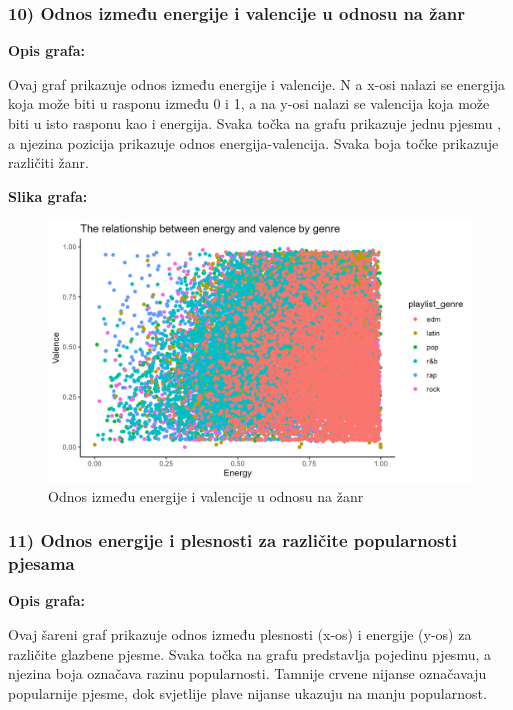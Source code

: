		\subsubsection{10) Odnos između energije i valencije u odnosu na žanr}
    
    \textbf{Opis grafa:}
    
    	Ovaj graf prikazuje odnos između energije i valencije. N a x-osi nalazi se energija koja može biti u rasponu između 0 i 1, a na y-osi nalazi se valencija koja može biti u isto rasponu kao i energija. Svaka točka na grafu prikazuje jednu pjesmu , a njezina pozicija prikazuje odnos energija-valencija. Svaka boja točke prikazuje različiti žanr. 
    
    \textbf{Slika grafa:}
    \begin{figure}[H]
        \includegraphics[scale=0.9]{slike/The relationship between energy and valence by genre.png}
        \centering
        \caption{Odnos između energije i valencije u odnosu na žanr}
        
    \end{figure}

	
		\subsubsection{11) Odnos energije i plesnosti za različite popularnosti pjesama}
	
	\textbf{Opis grafa:}
	
	Ovaj šareni graf prikazuje odnos između plesnosti (x-os) i energije (y-os) za različite glazbene pjesme. Svaka točka na grafu predstavlja pojedinu pjesmu, a njezina boja označava razinu popularnosti. Tamnije crvene nijanse označavaju popularnije pjesme, dok svjetlije plave nijanse ukazuju na manju popularnost.
	
